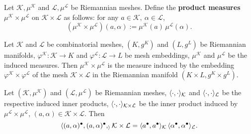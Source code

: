 \begin{definition}
  Let $\mathcal{K}, \mu^{\mathcal{K}}$ and $\mathcal{L}, \mu^{\mathcal{L}}$ be
  Riemannian meshes.
  Define the \textbf{product measures}
  $\mu^{\mathcal{K}} \times \mu^{\mathcal{L}}$
  on $\mathcal{K} \times \mathcal{L}$ as follows:
  for any $a \in \mathcal{K},\ \alpha \in \mathcal{L}$,
  \begin{equation}
    (\mu^{\mathcal{K}} \times \mu^{\mathcal{L}})(a, \alpha)
    := \mu^{\mathcal{K}}(a)\, \mu^{\mathcal{L}}(\alpha).
  \end{equation}
\end{definition}
\begin{proposition}
  Let
    $\mathcal{K}$ and $\mathcal{L}$ be combinatorial meshes,
    $(K, g^K)$ and $(L, g^L)$ be Riemannian manifolds,
    $\varphi^{\mathcal{K}} \colon \mathcal{K} \to K$ and
      $\varphi^{\mathcal{L}} \colon \mathcal{L} \to L$
      be mesh embeddings,
    $\mu^{\mathcal{K}}$ and $\mu^{\mathcal{L}}$ be the induced measures.
  Then $\mu^{\mathcal{K}} \times \mu^{\mathcal{L}}$ is the measure induced by
  the embedding $\varphi^{\mathcal{K}} \times \varphi^{\mathcal{L}}$ of the mesh
  $\mathcal{K} \times \mathcal{L}$
  in the Riemannian manifold $(K \times L, g^K \times g^L)$.
\end{proposition}
\begin{proposition}
  Let
    $(\mathcal{K}, \mu^{\mathcal{K}})$ and $(\mathcal{L}, \mu^{\mathcal{L}})$
      be Riemannian meshes,
    $\langle\cdot,\cdot\rangle_{\mathcal{K}}$ and
      $\langle\cdot,\cdot\rangle_{\mathcal{L}}$
      be the respective induced inner products,
    $\langle\cdot,\cdot\rangle_{\mathcal{K} \times \mathcal{L}}$
      be the inner product induced by
      $\mu^{\mathcal{L}} \times \mu^{\mathcal{L}}$,
    $(a, \alpha) \in \mathcal{K} \times \mathcal{L}$.
  Then
  \begin{equation}
    \langle(a, \alpha)^\bullet, (a, \alpha)^\bullet,_\rangle{\mathcal{K} \times \mathcal{L}}
    = \langle a^\bullet,a^\bullet\rangle_\mathcal{K}\, 
      \langle\alpha^\bullet,\alpha^\bullet\rangle_\mathcal{L}.
  \end{equation}
\end{proposition}
